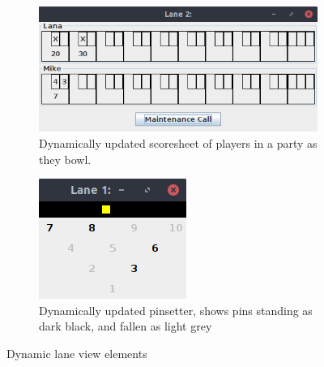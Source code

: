 \begin{figure}[H]
    \centering
    \begin{subfigure}{\textwidth}
        \includegraphics[width = \textwidth]{img/lanestatus.png}
        \caption{Dynamically updated scoresheet of players in a party as they bowl.}
    \end{subfigure}
    \begin{subfigure}{\textwidth}
        \includegraphics[width = \textwidth]{img/pinsetter.png}
        \caption{Dynamically updated pinsetter, shows pins standing as dark black, and fallen as light grey}
    \end{subfigure}
    \caption{Dynamic lane view elements}
\end{figure}

